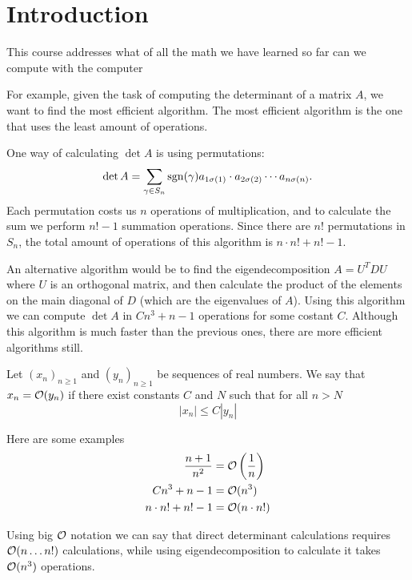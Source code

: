 \documentclass[11pt,a4paper]{article}
\begin{document}
\maketitle


\newpage
\tableofcontents
\newpage

\section{Introduction}
This course addresses what of all the math we have learned so far can
we compute with the computer

For example, given the task of computing the determinant of a matrix $A$,
we want to find the most efficient algorithm.
The most efficient algorithm is the one that uses the least amount of
operations.

One way of calculating $\det A$ is using permutations:
\[
  \det A = \sum_{\gamma \in S_n}
  \operatorname{sgn}(\gamma) a_{1 \sigma(1)} \cdot a_{2 \sigma(2)} \cdots a_{n \sigma(n)}.
\]
Each permutation costs us $n$ operations of multiplication, and to calculate
the sum we perform $n! - 1$ summation operations.
Since there are $n!$ permutations in $S_n$, the total amount of operations
of this algorithm is $n \cdot n! + n! - 1$.

An alternative algorithm would be to find the eigendecomposition
$A = U^{T} D U$ where $U$ is an orthogonal matrix, and then calculate
the product of the elements on the main diagonal of $D$ (which are the
eigenvalues of $A$).
Using this algorithm we can compute $\det A$ in $C n^3 + n - 1$ operations
for some costant $C$.
Although this algorithm is much faster than the previous ones, there are
more efficient algorithms still.

\begin{definition}
  Let $(x_n)_{n \geq 1}$ and $(y_n)_{n \geq 1}$ be sequences of real numbers.
  We say that $x_n = \mathcal{O}(y_n)$ if there exist constants $C$ and $N$ such that
  for all $n > N$
  \[
    |x_n| \le C |y_n|
  \]
\end{definition}

Here are some examples
\begin{align*}
  \frac{n + 1}{n^2} &= \O\del{\frac 1n} \\
  Cn^3 + n - 1 &= \O(n^3) \\
  n \cdot n! + n! - 1 &= \O(n \cdot n!)
\end{align*}

Using big $\mathcal{O}$ notation we can say that direct determinant calculations
requires $\mathcal{O}(n \dots n!)$ calculations, while using eigendecomposition
to calculate it takes $\mathcal{O}(n^3)$ operations.
\end{document}
